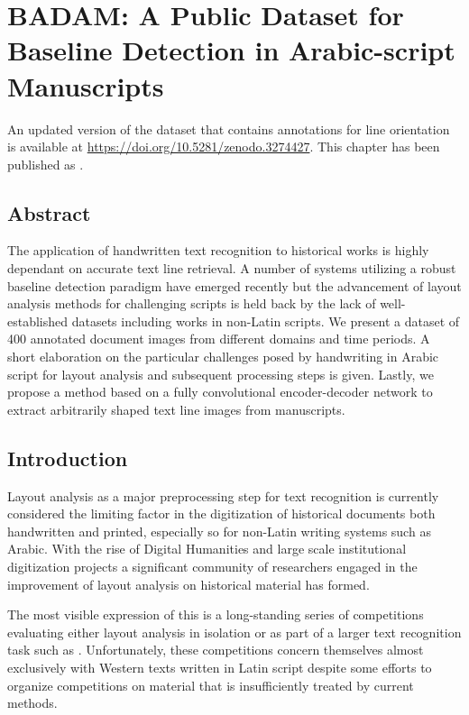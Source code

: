 \chapter{BADAM: A Public Dataset for Baseline Detection in Arabic-script Manuscripts}
\label{ch:hip}
\thispagestyle{empty}
\vfill
An updated version of the dataset that contains annotations for line
orientation is available at \url{https://doi.org/10.5281/zenodo.3274427}. This
chapter has been published as .

\newpage
\section*{Abstract}
	The application of handwritten text recognition to historical works is
	highly dependant on accurate text line retrieval. A number of systems
	utilizing a robust baseline detection paradigm have emerged recently
	but the advancement of layout analysis methods for challenging scripts
	is held back by the lack of well-established datasets including works
	in non-Latin scripts. We present a dataset of 400 annotated document
	images from different domains and time periods. A short elaboration on
	the particular challenges posed by handwriting in Arabic script for
	layout analysis and subsequent processing steps is given.  Lastly, we
	propose a method based on a fully convolutional encoder-decoder network
	to extract arbitrarily shaped text line images from manuscripts.

\section{Introduction}

Layout analysis as a major preprocessing step for text recognition is currently
considered the limiting factor in the digitization of historical documents both
handwritten and printed, especially so for non-Latin writing systems such as
Arabic. With the rise of Digital Humanities and large scale institutional
digitization projects a significant community of researchers engaged in the
improvement of layout analysis on historical material has formed.

The most visible expression of this is a long-standing series of competitions
evaluating either layout analysis in isolation
\cite{gatos2011icdar2009,antonacopoulos2009icdar,gatos2010icfhr,antonacopoulos2011historical,antonacopoulos2013icdar,murdock2015icdar,diem2017cbad}
or as part of a larger text recognition task such as
\cite{antonacopoulos2015icdar2015}. Unfortunately, these competitions concern
themselves almost exclusively with Western texts written in Latin script
despite some efforts to organize competitions on material that is
insufficiently treated by current methods.

